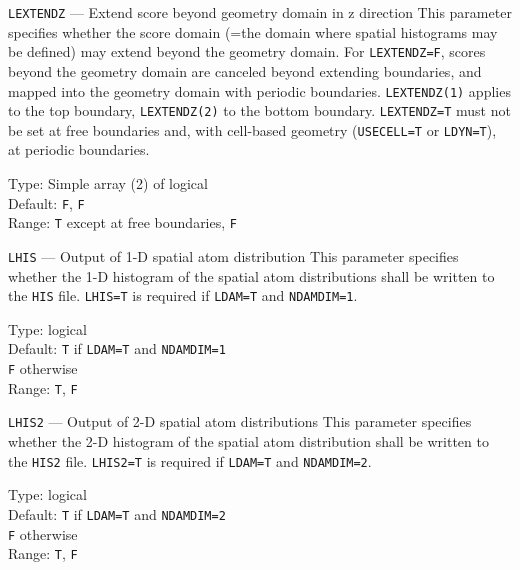 \begin{keydescription}{\texttt{LEXTENDZ} --- Extend score beyond geometry domain in z direction}
%
  This parameter specifies whether the score domain (=the domain where spatial histograms
  may be defined) may extend beyond the geometry domain. For \texttt{LEXTENDZ=F}, scores beyond
  the geometry domain are canceled beyond extending boundaries, and mapped into the geometry
  domain with periodic boundaries. \texttt{LEXTENDZ(1)} applies to the
  top boundary, \texttt{LEXTENDZ(2)} to the bottom boundary. \texttt{LEXTENDZ=T} must not be
  set at free boundaries and, with cell-based geometry (\texttt{USECELL=T} or \texttt{LDYN=T}),
  at periodic boundaries. 
  \begin{keytab}
    Type:    \> Simple array (2) of logical \\
    Default: \> \texttt{F}, \texttt{F} \\
    Range:   \> \texttt{T} except at free boundaries, \texttt{F} 
  \end{keytab}
\end{keydescription}

\begin{keydescription}{\texttt{LHIS} --- Output of 1-D spatial atom distribution}
%
  This parameter specifies whether the 1-D histogram of the spatial atom distributions shall be 
  written to the \texttt{HIS} file. \texttt{LHIS=T} is required if
  \texttt{LDAM=T} and \texttt{NDAMDIM=1}.
  \begin{keytab}
    Type:    \> logical \\
    Default: \> \texttt{T} if \texttt{LDAM=T} and \texttt{NDAMDIM=1} \\
             \> \texttt{F} otherwise \\
    Range:   \> \texttt{T}, \texttt{F} 
  \end{keytab}
\end{keydescription}

\begin{keydescription}{\texttt{LHIS2} --- Output of 2-D spatial atom distributions}
%
  This parameter specifies whether the 2-D histogram of the spatial atom distribution shall be 
  written to the \texttt{HIS2} file. \texttt{LHIS2=T} is required if
  \texttt{LDAM=T} and \texttt{NDAMDIM=2}.
  \begin{keytab}
    Type:    \> logical \\
    Default: \> \texttt{T} if \texttt{LDAM=T} and \texttt{NDAMDIM=2} \\
             \> \texttt{F} otherwise \\
    Range:   \> \texttt{T}, \texttt{F} 
  \end{keytab}
\end{keydescription}

